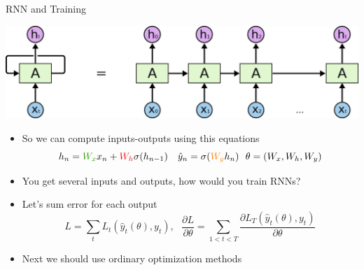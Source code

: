 \documentclass{beamer}
\begin{document}
\begin{frame}{RNN and Training}
	\begin{center}
		 \includegraphics[scale=0.23]{./img/rnn_ur}
	\end{center}
	\begin{itemize}
		 \item So we can compute inputs-outputs using this equations
		 $$h_n = \textcolor{green}{W_x} x_n + \textcolor{red}{W_h}\sigma(h_{n-1})~~~\hat{y}_n = \sigma(\textcolor{notgreen}{W_y}  h_n) ~~ \theta = (W_x, W_h, W_y)$$
		\vspace{-0.6cm}
		 \item You get several inputs and outputs, how would you train RNNs?
		 \item Let's sum error for each output
		  $$L = \sum_t L_t(\hat{y}_t(\theta), y_t),~~~ \frac{\partial L }{\partial \theta} = \sum_{1 < t < T}  \frac{\partial L_T(\hat{y}_t(\theta), y_t) }{\partial \theta}$$ 
		 \item Next we should use ordinary optimization methods
	\end{itemize} 
\end{frame}
\end{document}
